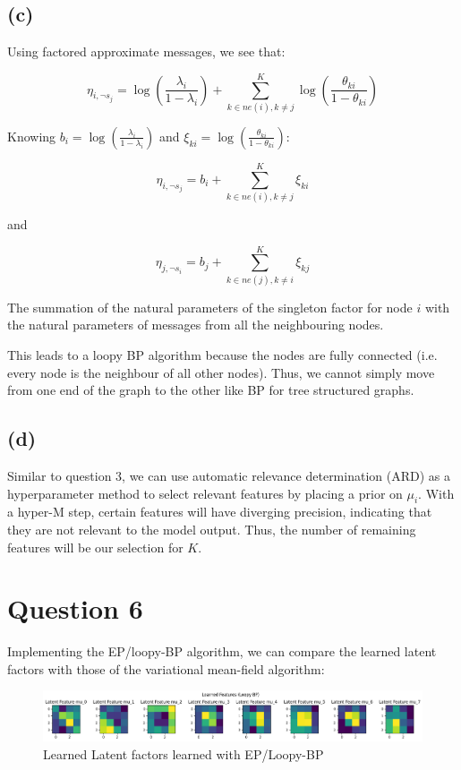 \documentclass[12pt]{article}
\begin{document}
\subsection*{(c)}

Using factored approximate messages, we see that:

\[\eta_{i, \neg s_j} =  \log \left(\frac{\lambda_i}{1-\lambda_i}\right) + \sum_{k\in ne(i), k\neq j}^{K} \log\left(\frac{\theta_{ki}}{1-\theta_{ki}} \right)\]

Knowing $b_i=\log \left(\frac{\lambda_i}{1-\lambda_i}\right)$ and $\xi_{ki}=\log\left(\frac{\theta_{ki}}{1-\theta_{ki}} \right)$:

\[\eta_{i, \neg s_j} =  b_i + \sum_{k\in ne(i), k\neq j}^{K} \xi_{ki}\]

and

\[\eta_{j, \neg s_i} =  b_j + \sum_{k\in ne(j), k\neq i}^{K} \xi_{kj}\]


The summation of the natural parameters of the singleton factor for node $i$ with the natural parameters of messages from all the neighbouring nodes.

This leads to a loopy BP algorithm because the nodes are fully connected (i.e. every node is the neighbour of all other nodes). Thus, we cannot simply move from one end of the graph to the other like BP for tree structured graphs.

\subsection*{(d)}

Similar to question 3, we can use automatic relevance determination (ARD) as a hyperparameter method to select relevant features by placing a prior on $\mu_i$. With a hyper-M step, certain features will have diverging precision, indicating that they are not relevant to the model output. Thus, the number of remaining features will be our selection for $K$.



\newpage
\section*{Question 6}

Implementing the EP/loopy-BP algorithm, we can compare the learned latent factors with those of the variational mean-field algorithm:

\begin{figure}[h]
\centering
\includegraphics[scale=0.4]{outputs/q6/all-latent-factors}
\caption{Learned Latent factors learned with EP/Loopy-BP}
\label{fig:6-latent-factors}
\end{figure}
\end{document}
